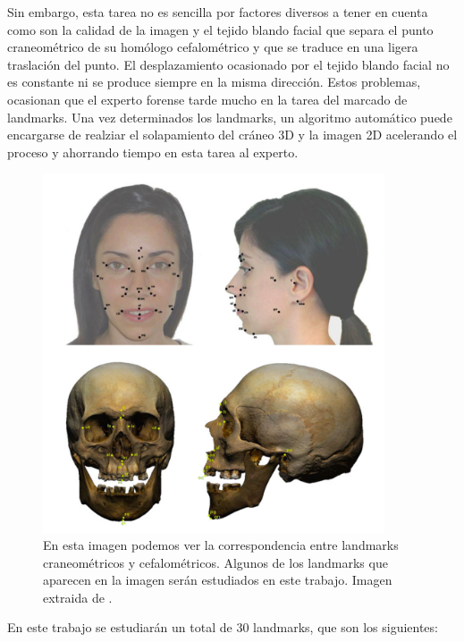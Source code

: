 \noindent Sin embargo, esta tarea no es sencilla por factores diversos a tener en cuenta como son la calidad de la imagen y el tejido blando facial que separa el punto craneométrico de su homólogo cefalométrico y que se traduce en una ligera traslación del punto. El desplazamiento ocasionado por el tejido blando facial no es constante ni se produce siempre en la misma dirección. Estos problemas, ocasionan que el experto forense tarde mucho en la tarea del marcado de landmarks. Una vez determinados los landmarks, un algoritmo automático puede encargarse de realziar el solapamiento del cráneo 3D y la imagen 2D acelerando el proceso y ahorrando tiempo en esta tarea al experto.

\begin{figure}[!h]
    \centering
    \includegraphics[width=0.9\textwidth]{img/marcado_landmarks.png}
    \caption{En esta imagen podemos ver la correspondencia entre landmarks craneométricos y cefalométricos. Algunos de los landmarks que aparecen en la imagen serán estudiados en este trabajo. Imagen extraida de \cite{damas2020handbook}.}
\end{figure}


\newpage

\noindent En este trabajo se estudiarán un total de $30$ landmarks, que son los siguientes: 


